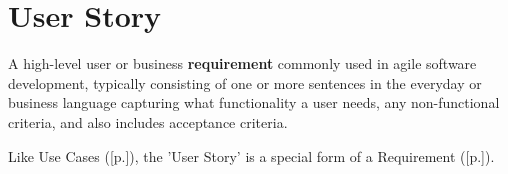 \section{User Story}
\label{sec:User Story}

A high-level user or business \textbf{requirement} commonly used in agile software development, typically consisting of one or more sentences in the everyday or business language capturing what functionality a user needs, any non-functional criteria, and also includes acceptance criteria.

Like Use Cases ([p.\pageref{sec:Use Case}]), the 'User Story' is a special form of a Requirement ([p.\pageref{sec:Requirement}]).